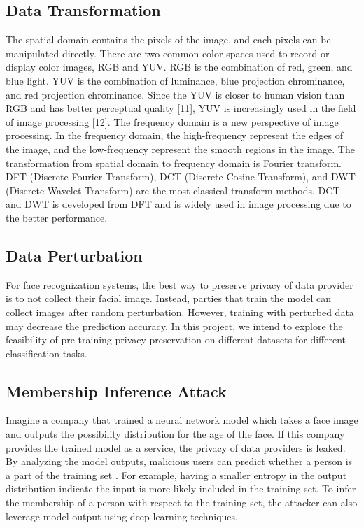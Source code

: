 \documentclass[conference]{IEEEtran}
\begin{document}
\subsection{Data Transformation}
The spatial domain contains the pixels of the image, and each pixels can be manipulated directly. There are two common color spaces used to record or display color images, RGB and YUV. RGB is the combination of red, green, and blue light. YUV is the combination of luminance, blue projection chrominance, and red projection chrominance. Since the YUV is closer to human vision than RGB and has better perceptual quality [11], YUV is increasingly used in the field of image processing [12].
The frequency domain is a new perspective of image processing. In the frequency domain, the high-frequency represent the edges of the image, and the low-frequency represent the smooth regions in the image. The transformation from spatial domain to frequency domain is Fourier transform. DFT (Discrete Fourier Transform), DCT (Discrete Cosine Transform), and DWT (Discrete Wavelet Transform) are the most classical transform methods. DCT and DWT is developed from DFT and is widely used in image processing due to the better performance. 

\subsection{Data Perturbation}
For face recognization systems, the best way to preserve privacy of data provider is to not collect their facial image. Instead, parties that train the model can collect images after random perturbation. However, training with perturbed data may decrease the prediction accuracy. In this project, we intend to explore the feasibility of pre-training privacy preservation on different datasets for different classification tasks.

\subsection{Membership Inference Attack}
Imagine a company that trained a neural network model which takes a face image and outputs the possibility distribution for the age of the face. If this company provides the trained model as a service, the privacy of data providers is leaked. By analyzing the model outputs, malicious users can predict whether a person is a part of the training set \cite{b13}. For example, having a smaller entropy in the output distribution indicate the input is more likely included in the training set. To infer the membership of a person with respect to the training set, the attacker can also leverage model output using deep learning techniques.
\end{document}
